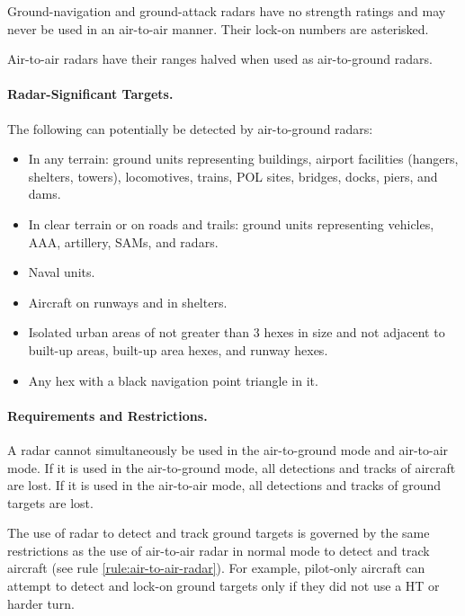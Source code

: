 \begin{advancedrules}
{Ground-navigation and ground-attack radars have no strength ratings and may never be used in an air-to-air manner. Their lock-on numbers are asterisked.

Air-to-air radars have their ranges halved when used as air-to-ground radars.

\paragraph{Radar-Significant Targets.} The following can potentially be detected by air-to-ground radars:

\begin{itemize}

    \item In any terrain: ground units representing buildings, airport facilities (hangers, shelters, towers), locomotives, trains, POL sites, bridges, docks, piers, and dams.

    \item In clear terrain or on roads and trails: ground units representing vehicles, AAA, artillery, SAMs, and radars.

    \item Naval units.

    \item Aircraft on runways and in shelters.

    \item Isolated urban areas of not greater than 3 hexes in size and not adjacent to built-up areas, built-up area hexes, and runway hexes.
    
    \item Any hex with a black navigation point triangle in it.

\end{itemize}

\paragraph{Requirements and Restrictions.} A radar cannot simultaneously be used in the air-to-ground mode and air-to-air mode. If it is used in the air-to-ground mode, all detections and tracks of aircraft are lost. If it is used in the air-to-air mode, all detections and tracks of ground targets are lost. 

The use of radar to detect and track ground targets is governed by the same restrictions as the use of air-to-air radar in normal mode to detect and track aircraft (see rule \ref{rule:air-to-air-radar}). For example, pilot-only aircraft can attempt to detect and lock-on ground targets only if they did not use a HT or harder turn.

}
\end{advancedrules}
